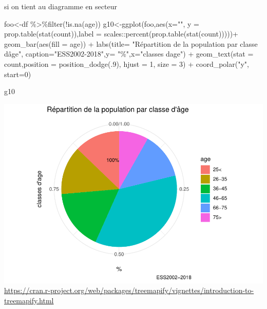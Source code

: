 \documentclass[
]{book}
\newenvironment{Shaded}{\begin{snugshade}}{\end{snugshade}}
\newcommand{\AttributeTok}[1]{\textcolor[rgb]{0.77,0.63,0.00}{#1}}
\newcommand{\DecValTok}[1]{\textcolor[rgb]{0.00,0.00,0.81}{#1}}
\newcommand{\FunctionTok}[1]{\textcolor[rgb]{0.00,0.00,0.00}{#1}}
\newcommand{\NormalTok}[1]{#1}
\newcommand{\OtherTok}[1]{\textcolor[rgb]{0.56,0.35,0.01}{#1}}
\newcommand{\SpecialCharTok}[1]{\textcolor[rgb]{0.00,0.00,0.00}{#1}}
\newcommand{\StringTok}[1]{\textcolor[rgb]{0.31,0.60,0.02}{#1}}
\begin{document}
si on tient au diagramme en secteur

\begin{Shaded}
\begin{Highlighting}[]
\NormalTok{foo}\OtherTok{\textless{}{-}}\NormalTok{df }\SpecialCharTok{\%\textgreater{}\%}\FunctionTok{filter}\NormalTok{(}\SpecialCharTok{!}\FunctionTok{is.na}\NormalTok{(age))}
\NormalTok{g10}\OtherTok{\textless{}{-}}\FunctionTok{ggplot}\NormalTok{(foo,}\FunctionTok{aes}\NormalTok{(}\AttributeTok{x=}\StringTok{""}\NormalTok{, }\AttributeTok{y =} \FunctionTok{prop.table}\NormalTok{(}\FunctionTok{stat}\NormalTok{(count)),}\AttributeTok{label =}\NormalTok{ scales}\SpecialCharTok{::}\FunctionTok{percent}\NormalTok{(}\FunctionTok{prop.table}\NormalTok{(}\FunctionTok{stat}\NormalTok{(count)))))}\SpecialCharTok{+}
  \FunctionTok{geom\_bar}\NormalTok{(}\FunctionTok{aes}\NormalTok{(}\AttributeTok{fill =}\NormalTok{ age)) }\SpecialCharTok{+}  
  \FunctionTok{labs}\NormalTok{(}\AttributeTok{title=} \StringTok{"Répartition de la population par classe d\textquotesingle{}âge"}\NormalTok{, }\AttributeTok{caption=}\StringTok{"ESS2002{-}2018"}\NormalTok{,}\AttributeTok{y=} \StringTok{"\%"}\NormalTok{,}\AttributeTok{x=}\StringTok{"classes d\textquotesingle{}age"}\NormalTok{) }\SpecialCharTok{+}
  \FunctionTok{geom\_text}\NormalTok{(}\AttributeTok{stat =} \StringTok{\textquotesingle{}count\textquotesingle{}}\NormalTok{,}\AttributeTok{position =} \FunctionTok{position\_dodge}\NormalTok{(.}\DecValTok{9}\NormalTok{),  }\AttributeTok{hjust =} \DecValTok{1}\NormalTok{, }\AttributeTok{size =} \DecValTok{3}\NormalTok{) }\SpecialCharTok{+} 
  \FunctionTok{coord\_polar}\NormalTok{(}\StringTok{"y"}\NormalTok{, }\AttributeTok{start=}\DecValTok{0}\NormalTok{)}



\NormalTok{g10}
\end{Highlighting}
\end{Shaded}

\includegraphics{bookdown-demo_files/figure-latex/310-1.pdf}
\url{https://cran.r-project.org/web/packages/treemapify/vignettes/introduction-to-treemapify.html}
\end{document}
